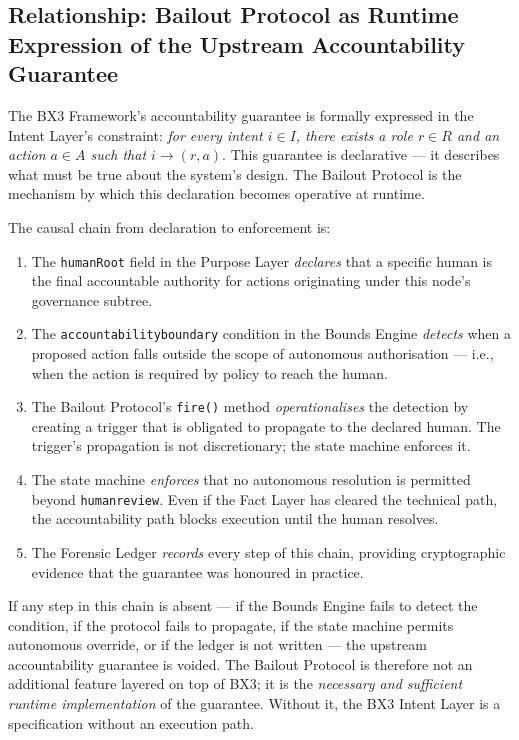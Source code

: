\subsection{Relationship: Bailout Protocol as Runtime Expression of the Upstream Accountability Guarantee}
\label{sec:bailout-runtime-expression}

The BX3 Framework's accountability guarantee is formally expressed in the Intent Layer's constraint: \emph{for every intent $i \in I$, there exists a role $r \in R$ and an action $a \in A$ such that $i \rightarrow (r, a)$}. This guarantee is declarative --- it describes what must be true about the system's design. The Bailout Protocol is the mechanism by which this declaration becomes operative at runtime.

The causal chain from declaration to enforcement is:

\begin{enumerate}
  \item The \texttt{humanRoot} field in the Purpose Layer \emph{declares} that a specific human is the final accountable authority for actions originating under this node's governance subtree.
  \item The \texttt{accountability\textunderscore boundary} condition in the Bounds Engine \emph{detects} when a proposed action falls outside the scope of autonomous authorisation --- i.e., when the action is required by policy to reach the human.
  \item The Bailout Protocol's \texttt{fire()} method \emph{operationalises} the detection by creating a trigger that is obligated to propagate to the declared human. The trigger's propagation is not discretionary; the state machine enforces it.
  \item The state machine \emph{enforces} that no autonomous resolution is permitted beyond \texttt{human\textunderscore review}. Even if the Fact Layer has cleared the technical path, the accountability path blocks execution until the human resolves.
  \item The Forensic Ledger \emph{records} every step of this chain, providing cryptographic evidence that the guarantee was honoured in practice.
\end{enumerate}

If any step in this chain is absent --- if the Bounds Engine fails to detect the condition, if the protocol fails to propagate, if the state machine permits autonomous override, or if the ledger is not written --- the upstream accountability guarantee is voided. The Bailout Protocol is therefore not an additional feature layered on top of BX3; it is the \emph{necessary and sufficient runtime implementation} of the guarantee. Without it, the BX3 Intent Layer is a specification without an execution path.

